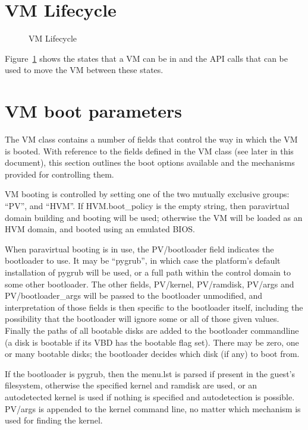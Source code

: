 %
%
%
%

\section{VM Lifecycle}

\begin{figure}
\centering
{}
\caption{VM Lifecycle}
\label{fig-vm-lifecycle}
\end{figure}

Figure~\ref{fig-vm-lifecycle} shows the states that a VM can be in
and the API calls that can be used to move the VM between these states.

\section{VM boot parameters}

The VM class contains a number of fields that control the way in which the VM is booted.
With reference to the fields defined in the VM class (see later in this document),
this section outlines the boot options available and the mechanisms provided for controlling them.

VM booting is controlled by setting one of the two mutually exclusive groups: ``PV'', and ``HVM''.  If HVM.boot\_policy is the empty string, then paravirtual domain building and booting will be used; otherwise the VM will be loaded as an HVM domain, and booted using an emulated BIOS.

When paravirtual booting is in use, the PV/bootloader field indicates the bootloader to use.  It may be ``pygrub'', in which case the platform's default installation of pygrub will be used, or a full path within the control domain to some other bootloader.  The other fields, PV/kernel, PV/ramdisk, PV/args and PV/bootloader\_args will be passed to the bootloader unmodified, and interpretation of those fields is then specific to the bootloader itself, including the possibility that the bootloader will ignore some or all of those given values. Finally the paths of all bootable disks are added to the bootloader commandline (a disk is bootable if its VBD has the bootable flag set). There may be zero, one or many bootable disks; the bootloader decides which disk (if any) to boot from.

If the bootloader is pygrub, then the menu.lst is parsed if present in the guest's filesystem, otherwise the specified kernel and ramdisk are used, or an autodetected kernel is used if nothing is specified and autodetection is possible.  PV/args is appended to the kernel command line, no matter which mechanism is used for finding the kernel.

